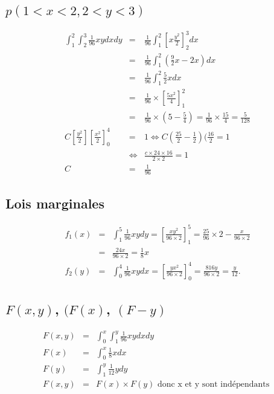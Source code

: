 \documentclass[a4paper, 11pt]{article}
\begin{document}
	\subsection{$p(1<x<2, 2<y<3)$}
	\begin{eqnarray*}
		\int^2_1 \int^3_2 \frac{1}{96} xydxdy &=& \frac{1}{96} \int^2_1 [x\frac{y^2}{2}]^3_2 dx\\
		&=& \frac{1}{96} \int^2_1 (\frac{9}{2}x - 2x)dx\\
		&=& \frac{1}{96} \int^2_1 \frac{5}{2}x dx\\
		&=& \frac{1}{96}\times[\frac{5x^2}{4}]^2_1\\
		&=& \frac{1}{96} \times (5-\frac{5}{4}) = \frac{1}{96} \times \frac{15}{4} = \frac{5}{128}\\
		C[\frac{y^2}{2}][\frac{x^2}{2}]^4_0 &=& 1 \Leftrightarrow C (\frac{25}{2} - \frac{1}{2})(\frac{16}{2}= 1\\
		&\Leftrightarrow& \frac{c \times 24 \times 16}{2 \times 2} = 1\\
		C &=&\frac{1}{96} 
	\end{eqnarray*}

	\subsection{Lois marginales}
	\begin{eqnarray*}
		f_1(x) &=&  \int^5_1 \frac{1}{96}xydy = [\frac{xy^2}{96\times2}]^5_1 = \frac{25}{96} \times 2 - \frac{x}{96\times 2} \\ 
		&=& \frac{24x}{96 \times 2} = \frac{1}{8}x\\
		f_2(y)&=& \int^4_0 \frac{1}{96} xydx = [\frac{yx^2}{96 \times 2}]^4_0 = \frac{816y}{96\times 2} = \frac{y}{12}.
	\end{eqnarray*}

	\subsection{$F(x,y)$, $(F(x)$, $(F-y)$}
	\begin{eqnarray*}
		F(x,y) &=& \int^x_0 \int^y_1 \frac{1}{96} xydxdy\\
		F(x) &=& \int^x_0 \frac{1}{8} xdx\\
		F(y) &=&  \int^y_1 \frac{1}{12} ydy\\
		F(x,y) &=&  F(x) \times F(y) \textrm{ donc x et y sont indépendants }
	\end{eqnarray*}

	
\end{document}
